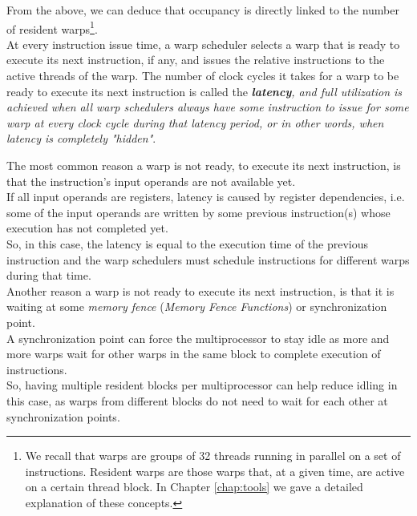 	From the above, we can deduce that occupancy is directly linked to the number of resident warps\footnote{We recall that warps are groups of 32 threads running in parallel on a set of instructions. Resident warps are those warps that, at a given time, are active on a certain thread block. In Chapter \ref{chap:tools} we gave a detailed explanation of these concepts.}.\\
	At every instruction issue time, a warp scheduler selects a warp that is ready to execute its next instruction, if any, and issues the relative instructions to the active threads of the warp.
	The number of clock cycles it takes for a warp to be ready to execute its next instruction is called the \textit{\textbf{latency}, and full utilization is achieved when all warp schedulers always have some instruction to issue for some warp at every clock cycle during that latency period, or in other words, when latency is completely "hidden"}\cite{perfoptimize,understandlatency}. 
	
	The most common reason a warp is not ready, to execute its next instruction, is that the instruction's input operands are not available yet.\\
	If all input operands are registers, latency is caused by register dependencies, i.e. some of the input operands are written by some previous instruction(s) whose execution has not completed yet.\\ 
	So, in this case, the latency is equal to the execution time of the previous instruction and the warp schedulers must schedule instructions for different warps during that time\cite{cudaguide,understandlatency}.\\

	Another reason a warp is not ready to execute its next instruction, is that it is waiting at some \textit{memory fence} (\textit{Memory Fence Functions}) or synchronization point.\\ A synchronization point can force the multiprocessor to stay idle as more and more warps wait for other warps in the same block to complete execution of instructions.\\
	So, having multiple resident blocks per multiprocessor can help reduce idling in this case, as warps from different blocks do not need to wait for each other at synchronization points.
	
